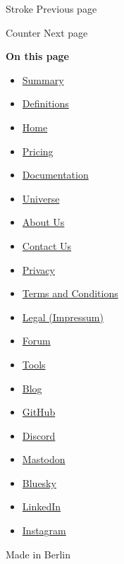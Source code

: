 \href{/docs/reference/visualize/stroke/}{\pandocbounded{}}

{ Stroke } { Previous page }

\href{/docs/reference/introspection/counter/}{\pandocbounded{}}

{ Counter } { Next page }

\textbf{On this page}

\begin{itemize}
\tightlist
\item
  \hyperref[summary]{Summary}
\item
  \hyperref[definitions]{Definitions}
\end{itemize}

\begin{itemize}
\tightlist
\item
  \href{/}{Home}
\item
  \href{/pricing/}{Pricing}
\item
  \href{/docs/}{Documentation}
\item
  \href{/universe/}{Universe}
\item
  \href{/about/}{About Us}
\item
  \href{/contact/}{Contact Us}
\item
  \href{/privacy/}{Privacy}
\item
  \href{https://typst.app/terms}{Terms and Conditions}
\item
  \href{/legal/}{Legal (Impressum)}
\end{itemize}

\begin{itemize}
\tightlist
\item
  \href{https://forum.typst.app}{Forum}
\item
  \href{/tools/}{Tools}
\item
  \href{/blog/}{Blog}
\item
  \href{https://github.com/typst/}{GitHub}
\item
  \href{https://discord.gg/2uDybryKPe}{Discord}
\item
  \href{https://mastodon.social/@typst}{Mastodon}
\item
  \href{https://bsky.app/profile/typst.app}{Bluesky}
\item
  \href{https://www.linkedin.com/company/typst/}{LinkedIn}
\item
  \href{https://instagram.com/typstapp/}{Instagram}
\end{itemize}

Made in Berlin

